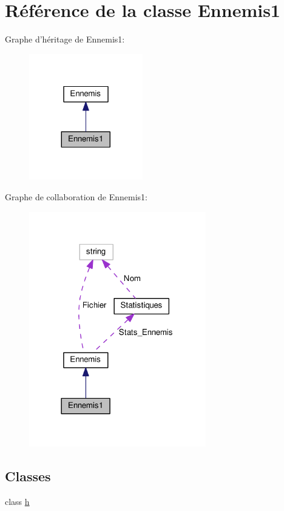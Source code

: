 \hypertarget{classEnnemis1}{\section{Référence de la classe Ennemis1}
\label{classEnnemis1}
}


Graphe d'héritage de Ennemis1\+:\nopagebreak
\begin{figure}[H]
\begin{center}
\leavevmode
\includegraphics[width=140pt]{classEnnemis1__inherit__graph}
\end{center}
\end{figure}


Graphe de collaboration de Ennemis1\+:\nopagebreak
\begin{figure}[H]
\begin{center}
\leavevmode
\includegraphics[width=218pt]{classEnnemis1__coll__graph}
\end{center}
\end{figure}
\subsection*{Classes}
\begin{DoxyCompactItemize}
\item 
class \hyperlink{classEnnemis1_1_1h}{h}
\end{DoxyCompactItemize}
